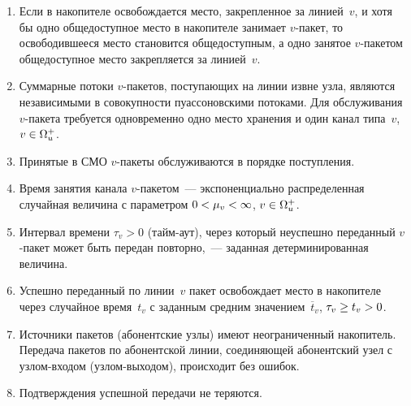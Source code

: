\begin{multicols}{2}
\begin{enumerate}[1.]
\item Если в накопителе освобождается место, закрепленное за линией~$v$, 
и хотя бы одно общедоступное место в накопителе занимает $v$-пакет, то 
освободившееся место становится общедоступным, а одно занятое 
$v$-пакетом общедоступное место закрепляется за линией~$v$. 
\item Суммарные потоки $v$-пакетов, поступающих на линии извне узла, 
являются независимыми в совокупности пуассоновскими потоками. Для 
обслуживания $v$-пакета требуется одновременно одно место хранения и 
один канал типа~$v$, $v\hm\in\Omega_u^+$.
\item Принятые в СМО $v$-пакеты обслуживаются в порядке поступления.
\item Время занятия канала $v$-пакетом~--- экспоненциально 
распределенная случайная величина с параметром $0 \hm<\mu_v\hm<\infty$, 
$v\hm\in\Omega_u^+$.
\item Интервал времени $\tau_v>0$ (тайм-аут), через который неуспешно 
переданный $v$-пакет может быть передан повторно,~--- заданная 
детерминированная величина. 
\item Успешно переданный по линии~$v$ пакет освобождает место в 
накопителе через случайное время~$t_v$ с заданным средним 
значением~$\overline{t}_v$, $\tau_v\hm\geq t_v\hm>0$.
\item Источники пакетов (абонентские узлы) имеют неограниченный 
накопитель. Передача пакетов по абонентской линии, соединяющей 
абонентский узел с уз\-лом-вхо\-дом (уз\-лом-вы\-хо\-дом), происходит без 
ошибок. 
\item Подтверждения успешной передачи не те\-ря\-ются.
\end{enumerate}


\end{multicols}
